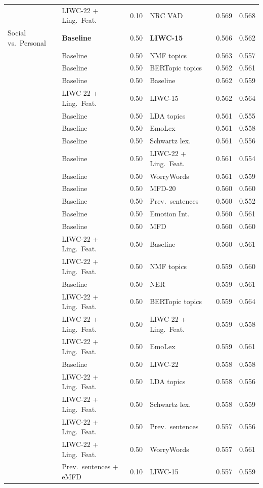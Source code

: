 {\begin{longtable}{llclcc}
 & LIWC-22 + Ling.\ Feat. & 0.10 & NRC VAD & 0.569 & 0.568 \\
Social vs.\ Personal & \textbf{Baseline} & 0.50 & \textbf{LIWC-15} & 0.566 & 0.562 \\
 & Baseline & 0.50 & NMF topics & 0.563 & 0.557 \\
 & Baseline & 0.50 & BERTopic topics & 0.562 & 0.561 \\
 & Baseline & 0.50 & Baseline & 0.562 & 0.559 \\
 & LIWC-22 + Ling.\ Feat. & 0.50 & LIWC-15 & 0.562 & 0.564 \\
 & Baseline & 0.50 & LDA topics & 0.561 & 0.555 \\
 & Baseline & 0.50 & EmoLex & 0.561 & 0.558 \\
 & Baseline & 0.50 & Schwartz lex. & 0.561 & 0.556 \\
 & Baseline & 0.50 & LIWC-22 + Ling.\ Feat. & 0.561 & 0.554 \\
 & Baseline & 0.50 & WorryWords & 0.561 & 0.559 \\
 & Baseline & 0.50 & MFD-20 & 0.560 & 0.560 \\
 & Baseline & 0.50 & Prev.\ sentences & 0.560 & 0.552 \\
 & Baseline & 0.50 & Emotion Int. & 0.560 & 0.561 \\
 & Baseline & 0.50 & MFD & 0.560 & 0.560 \\
 & LIWC-22 + Ling.\ Feat. & 0.50 & Baseline & 0.560 & 0.561 \\
 & LIWC-22 + Ling.\ Feat. & 0.50 & NMF topics & 0.559 & 0.560 \\
 & Baseline & 0.50 & NER & 0.559 & 0.561 \\
 & LIWC-22 + Ling.\ Feat. & 0.50 & BERTopic topics & 0.559 & 0.564 \\
 & LIWC-22 + Ling.\ Feat. & 0.50 & LIWC-22 + Ling.\ Feat. & 0.559 & 0.558 \\
 & LIWC-22 + Ling.\ Feat. & 0.50 & EmoLex & 0.559 & 0.561 \\
 & Baseline & 0.50 & LIWC-22 & 0.558 & 0.558 \\
 & LIWC-22 + Ling.\ Feat. & 0.50 & LDA topics & 0.558 & 0.556 \\
 & LIWC-22 + Ling.\ Feat. & 0.50 & Schwartz lex. & 0.558 & 0.559 \\
 & LIWC-22 + Ling.\ Feat. & 0.50 & Prev.\ sentences & 0.557 & 0.556 \\
 & LIWC-22 + Ling.\ Feat. & 0.50 & WorryWords & 0.557 & 0.561 \\
 & Prev.\ sentences + eMFD & 0.10 & LIWC-15 & 0.557 & 0.559 \\

\end{longtable}}
